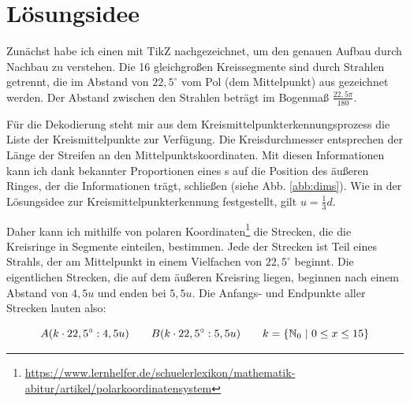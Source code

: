 \section{Lösungsidee}
	\begin{figure}
		\setlength\intextsep{0pt}
		\centering
		
		\caption{}
		\label{abb:spidergrafik}
		\vspace{-20pt}
	\end{figure}
	Zunächst habe ich einen \task{} mit TikZ nachgezeichnet, um den genauen Aufbau durch Nachbau zu verstehen. Die 16 gleichgroßen Kreissegmente sind durch Strahlen getrennt, die im Abstand von \(22,5^{\circ}\) vom Pol (dem Mittelpunkt) aus gezeichnet werden. Der Abstand zwischen den Strahlen beträgt im Bogenmaß \(\frac{22,5\pi}{180}\).

	Für die Dekodierung steht mir aus dem Kreismittelpunkterkennungsprozess die Liste der Kreismittelpunkte zur Verfügung. Die Kreisdurchmesser entsprechen der Länge der Streifen an den Mittelpunktskoordinaten. Mit diesen Informationen kann ich dank bekannter Proportionen eines \task{}s auf die Position des äußeren Ringes, der die Informationen trägt, schließen (siehe Abb. \ref{abb:dims}). Wie in der Lösungsidee zur Kreismittelpunkterkennung festgestellt, gilt \(u=\frac{1}{3}d\).

	\begin{figure}
		\setlength\intextsep{0pt}
		\centering	
		
		\caption{}
		\label{abb:trigon}
	\end{figure}
	Daher kann ich mithilfe von polaren Koordinaten\footnote{\url{https://www.lernhelfer.de/schuelerlexikon/mathematik-abitur/artikel/polarkoordinatensystem}} die Strecken, die die Kreisringe in Segmente einteilen, bestimmen. Jede der Strecken ist Teil eines Strahls, der am Mittelpunkt in einem Vielfachen von \(22,5^{\circ}\) beginnt. Die eigentlichen Strecken, die auf dem äußeren Kreisring liegen, beginnen nach einem Abstand von \(4,5u\) und enden bei \(5,5u\). Die Anfangs- und Endpunkte aller Strecken lauten also:

	\begin{equation}
	A(k \cdot 22,5^{\circ}:4,5u) \hspace{2em} B(k \cdot 22,5^{\circ}:5,5u) \hspace{2em} k = \{\mathbb{N}_0 \hspace{0.3em}|\hspace{0.3em} 0 \le x \le 15\}
	\end{equation}

